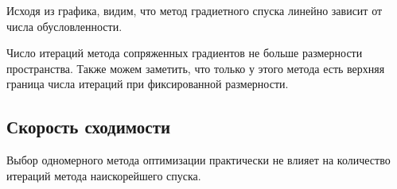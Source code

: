 \documentclass[a4paper,12pt]{article}
\begin{document}
Исходя из графика, видим, что метод градиетного спуска линейно зависит от числа обусловленности. 

Число итераций метода сопряженных градиентов не больше размерности пространства. Также можем заметить, что только у этого метода есть верхняя граница числа итераций при фиксированной размерности.

\subsection{Скорость сходимости}
Выбор одномерного метода оптимизации практически не влияет на количество итераций метода наискорейшего спуска.
\end{document}
